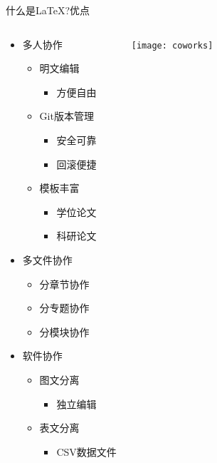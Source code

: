 \documentclass[xcolor=svgnames, t, aspectratio=169]{ctexbeamer}
\begin{document}
\begin{frame}[t]{什么是\LaTeX?}{优点}
  \vspace{-3ex}
  \begin{columns}%
  \begin{spacing}{0.7}
  \begin{itemize}
  \item \alert{多人}协作
    \begin{itemize}
    \item 明文编辑
      \begin{itemize}
      \item 方便自由
      \end{itemize}
    \item Git版本管理
      \begin{itemize}
      \item 安全可靠
      \item 回滚便捷
      \end{itemize}
    \item 模板丰富
      \begin{itemize}
      \item 学位论文
      \item 科研论文
      \end{itemize}
    \end{itemize}
  \item \alert{多文件}协作
    \begin{itemize}
    \item 分章节协作
    \item 分专题协作
    \item 分模块协作
    \end{itemize}
  \item \alert{软件}协作
    \begin{itemize}
    \item 图文分离
      \begin{itemize}
      \item 独立编辑
      \end{itemize}
    \item 表文分离
      \begin{itemize}
      \item CSV数据文件
      \end{itemize}
    \end{itemize}
  \end{itemize}
  \end{spacing}
  \begin{center}
    \texttt{[image: coworks]}
  \end{center}
\end{columns}
\end{frame}
\end{document}
